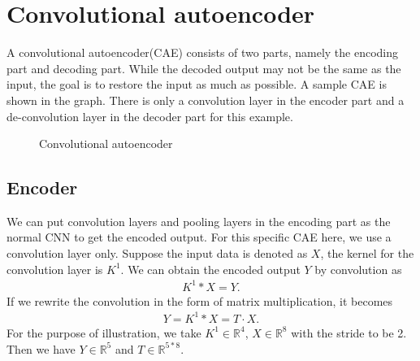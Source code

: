 
\section{Convolutional autoencoder}
A convolutional autoencoder(CAE) consists of two parts, namely the encoding part and decoding part. While the decoded output may not be the same as the input, the goal is to restore the input as much as possible. A sample CAE is shown in the graph. There is only a convolution layer in the encoder part and a de-convolution layer in the decoder part for this example.

\begin{figure}[htbp]
\caption{Convolutional autoencoder}
\end{figure}


\subsection{Encoder}
We can put convolution layers and pooling layers in the encoding part as the normal CNN to get the encoded output. For this specific CAE here, we use a convolution layer only.
Suppose the input data is denoted as $X$, the kernel for the convolution layer is $K^1$. We can obtain the encoded output $Y$ by convolution as
\begin{align}
    K^1 * X  = Y.
\end{align}
If we rewrite the convolution in the form of matrix multiplication, it becomes
\begin{align}
   Y = K^1 * X = T \cdot X.
\end{align}
For the purpose of illustration, we take $K^1 \in \mathbb{R}^4$, $X \in \mathbb{R}^8$ with the stride to be 2. Then we have $Y \in \mathbb{R}^5$ and $T \in \mathbb{R}^{5*8}$.

